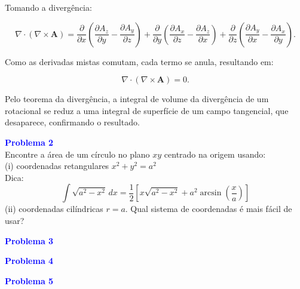 \documentclass[a4paper,12pt]{article}
\begin{document}
Tomando a divergência:

\begin{equation}
    \nabla \cdot (\nabla \times \mathbf{A}) = \frac{\partial}{\partial x} \left( \frac{\partial A_z}{\partial y} - \frac{\partial A_y}{\partial z} \right) + 
    \frac{\partial}{\partial y} \left( \frac{\partial A_x}{\partial z} - \frac{\partial A_z}{\partial x} \right) + 
    \frac{\partial}{\partial z} \left( \frac{\partial A_y}{\partial x} - \frac{\partial A_x}{\partial y} \right).
\end{equation}

Como as derivadas mistas comutam, cada termo se anula, resultando em:

\begin{equation}
    \nabla \cdot (\nabla \times \mathbf{A}) = 0.
\end{equation}

Pelo teorema da divergência, a integral de volume da divergência de um rotacional se reduz a uma integral de superfície 
de um campo tangencial, que desaparece, confirmando o resultado.

\begin{flushleft}
\textbf{\textcolor{blue}{Problema 2}}\\
Encontre a área de um círculo no plano \(xy\) centrado na origem usando: \\ 
(i) coordenadas retangulares \(x^2 + y^2 = a^2 \) \\
Dica:
\begin{equation}
\int \sqrt{a^2 - x^2} \, dx = \frac{1}{2} \left[ x\sqrt{a^2 - x^2} + a^2 \arcsin\left(\frac{x}{a}\right) \right]
\end{equation}
(ii) coordenadas cilíndricas \(r = a\).  
Qual sistema de coordenadas é mais fácil de usar?
\end{flushleft}
    
\begin{flushleft}
\textbf{\textcolor{blue}{Problema 3}}\\
\end{flushleft}

\begin{flushleft}
\textbf{\textcolor{blue}{Problema 4}}\\
\end{flushleft}

\begin{flushleft}
\textbf{\textcolor{blue}{Problema 5}}\\
\end{flushleft}
\end{document}

